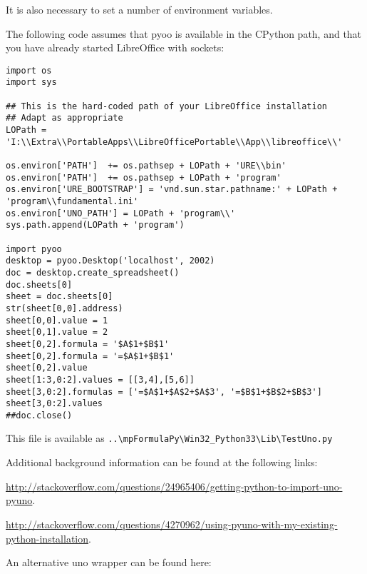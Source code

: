 \vpara
It is also necessary to set a number of environment variables. 

The following code assumes that pyoo is available in the CPython path, and that you have already started LibreOffice with sockets:


\begin{lstlisting}
import os
import sys

## This is the hard-coded path of your LibreOffice installation
## Adapt as appropriate
LOPath = 'I:\\Extra\\PortableApps\\LibreOfficePortable\\App\\libreoffice\\'

os.environ['PATH']  += os.pathsep + LOPath + 'URE\\bin'
os.environ['PATH']  += os.pathsep + LOPath + 'program'
os.environ['URE_BOOTSTRAP'] = 'vnd.sun.star.pathname:' + LOPath + 'program\\fundamental.ini'
os.environ['UNO_PATH'] = LOPath + 'program\\'
sys.path.append(LOPath + 'program')

import pyoo
desktop = pyoo.Desktop('localhost', 2002)
doc = desktop.create_spreadsheet()
doc.sheets[0]
sheet = doc.sheets[0]
str(sheet[0,0].address)
sheet[0,0].value = 1
sheet[0,1].value = 2
sheet[0,2].formula = '$A$1+$B$1'
sheet[0,2].formula = '=$A$1+$B$1'
sheet[0,2].value
sheet[1:3,0:2].values = [[3,4],[5,6]]
sheet[3,0:2].formulas = ['=$A$1+$A$2+$A$3', '=$B$1+$B$2+$B$3']
sheet[3,0:2].values
##doc.close()
\end{lstlisting}

This file is available as 
\verb|..\mpFormulaPy\Win32_Python33\Lib\TestUno.py|


Additional background information can be found at the following links:

\vpara
\href{http://stackoverflow.com/questions/24965406/getting-python-to-import-uno-pyuno}{http://stackoverflow.com/questions/24965406/getting-python-to-import-uno-pyuno}. 


\vpara
\href{http://stackoverflow.com/questions/4270962/using-pyuno-with-my-existing-python-installation}{http://stackoverflow.com/questions/4270962/using-pyuno-with-my-existing-python-installation}. 

An alternative uno wrapper can be found here:


